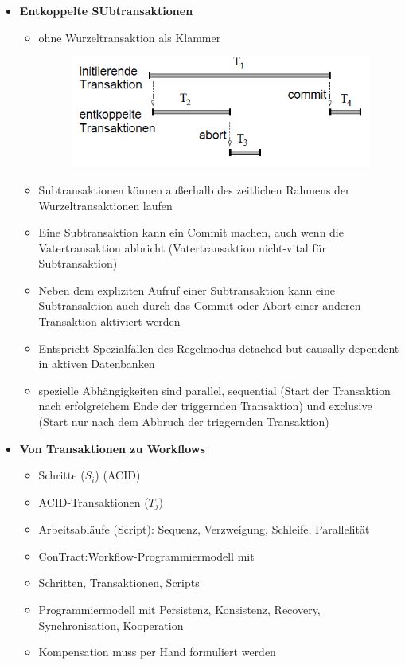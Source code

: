 \begin{itemize}
\begin{itemize}
		\item \textbf{Entkoppelte SUbtransaktionen}
		\begin{itemize}
			\item ohne Wurzeltransaktion als Klammer
			\begin{figure}[!h]
				\centering
				\includegraphics[scale=0.7]{img/root_transaction.png}
			\end{figure}
			\item Subtransaktionen können außerhalb des zeitlichen Rahmens der Wurzeltransaktionen laufen
			\item Eine Subtransaktion kann ein Commit machen, auch wenn die Vatertransaktion abbricht (Vatertransaktion nicht-vital für Subtransaktion)
			\item Neben dem expliziten Aufruf einer Subtransaktion kann eine Subtransaktion auch durch das Commit oder Abort einer anderen Transaktion aktiviert werden
			\item Entspricht Spezialfällen des Regelmodus detached but causally dependent in aktiven Datenbanken
			\item spezielle Abhängigkeiten sind parallel, sequential (Start der Transaktion nach erfolgreichem Ende der triggernden Transaktion) und exclusive (Start nur nach dem Abbruch der triggernden Transaktion)
		\end{itemize}
		
		\item \textbf{Von Transaktionen zu Workflows}
		\begin{itemize}
			\item Schritte ($S_i$) (ACID)
			\item ACID-Transaktionen ($T_j$)
			\item Arbeitsabläufe (Script): Sequenz, Verzweigung, Schleife, Parallelität
			\item ConTract:Workflow-Programmiermodell mit
			\item Schritten, Transaktionen, Scripts
			\item Programmiermodell mit Persistenz, Konsistenz, Recovery, Synchronisation, Kooperation
			\item Kompensation muss per Hand formuliert werden
			

\end{itemize}
\end{itemize}
\end{itemize}
